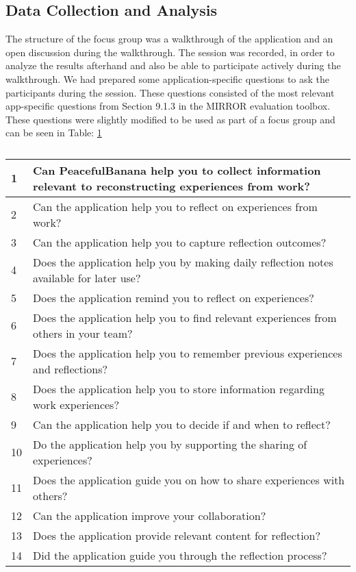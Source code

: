 \subsection{Data Collection and Analysis}
The structure of the focus group was a walkthrough of the application and an open discussion during the walkthrough. The session was recorded, in order to analyze the results afterhand and also be able to participate actively during the walkthrough. We had prepared some application-specific questions to ask the participants during the session. These questions consisted of the most relevant app-specific questions from Section 9.1.3 in the MIRROR evaluation toolbox\cite{mirrorevaluation}. These questions were slightly modified to be used as part of a focus group and can be seen in Table: \ref{questiontable}
\begin{table}[H]
    \begin{tabularx}{\textwidth}{|l|X|}
    \hline
    1  & Can PeacefulBanana help you to collect information relevant to reconstructing experiences from work? \\ \hline
    2  & Can the application help you to reflect on experiences from work?                                    \\ \hline
    3  & Can the application help you to capture reflection outcomes?                                         \\ \hline
    4  & Does the application help you by making daily reflection notes available for later use?              \\ \hline
    5  & Does the application remind you to reflect on experiences?                                           \\ \hline
    6  & Does the application help you to find relevant experiences from others in your team?                 \\ \hline
    7  & Does the application help you to remember previous experiences and reflections?                      \\ \hline
    8  & Does the application help you to store information regarding work experiences?                       \\ \hline
    9  & Can the application help you to decide if and when to reflect?                                       \\ \hline
    10 & Do the application help you by supporting the sharing of experiences?                                \\ \hline
    11 & Does the application guide you on how to share experiences with others?                              \\ \hline
    12 & Can the application improve your collaboration?                                                      \\ \hline
    13 & Does the application provide relevant content for reflection?                                        \\ \hline
    14 & Did the application guide you through the reflection process?                                        \\ \hline
    \end{tabularx}
    \caption{}
    \label{questiontable}
\end{table}

